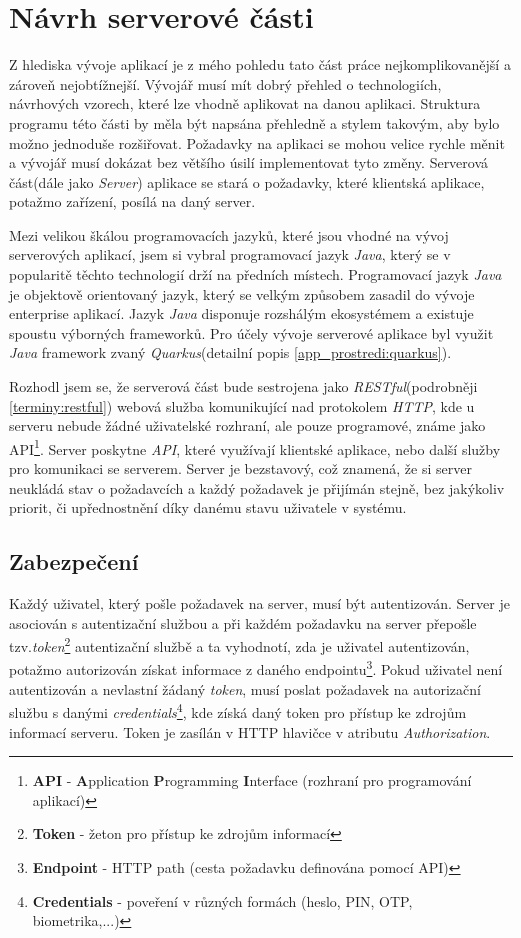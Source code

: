 \newpage
\section{Návrh serverové části}
\label{navrh:backend}
Z hlediska vývoje aplikací je z mého pohledu tato část práce nejkomplikovanější a zároveň nejobtížnejší.
Vývojář musí mít dobrý přehled o technologiích, návrhových vzorech, které lze vhodně aplikovat na danou aplikaci.
Struktura programu této části by měla být napsána přehledně a stylem takovým, aby bylo možno jednoduše rozšiřovat.
Požadavky na aplikaci se mohou velice rychle měnit a vývojář musí dokázat bez většího úsilí implementovat tyto změny.
Serverová část(dále jako \emph{Server}) aplikace se stará o požadavky, které klientská aplikace, potažmo zařízení, posílá na daný server.

Mezi velikou škálou programovacích jazyků, které jsou vhodné na vývoj serverových aplikací, jsem si vybral programovací jazyk \emph{Java},
který se v popularitě těchto technologií drží na předních místech. Programovací jazyk \emph{Java} je objektově orientovaný jazyk, který se velkým způsobem zasadil do vývoje enterprise aplikací.
Jazyk \emph{Java} disponuje rozshálým ekosystémem a existuje spoustu výborných frameworků. Pro účely vývoje serverové aplikace byl využit \emph{Java} framework zvaný \emph{Quarkus}(detailní popis \ref{app_prostredi:quarkus}).

Rozhodl jsem se, že serverová část bude sestrojena jako \emph{RESTful}(podrobněji \ref{terminy:restful}) webová služba komunikující nad protokolem \emph{HTTP},
kde u serveru nebude žádné uživatelské rozhraní, ale pouze programové, známe jako API\footnote{\textbf{API} - \textbf{A}pplication \textbf{P}rogramming \textbf{I}nterface (rozhraní pro programování aplikací)}.
Server poskytne \emph{API}, které využívají klientské aplikace, nebo další služby pro komunikaci se serverem.
Server je bezstavový, což znamená, že si server neukládá stav o požadavcích a každý požadavek je přijímán stejně, bez jakýkoliv priorit, či upřednostnění díky danému stavu uživatele v systému.

\subsection*{Zabezpečení}
\label{backend:bezpecnost}
Každý uživatel, který pošle požadavek na server, musí být autentizován.
Server je asociován s autentizační službou a při každém požadavku na server přepošle tzv.\emph{token}\footnote{\textbf{Token} - žeton pro přístup ke zdrojům informací} autentizační službě
a ta vyhodnotí, zda je uživatel autentizován, potažmo autorizován získat informace z daného endpointu\footnote{\textbf{Endpoint} - HTTP path (cesta požadavku definována pomocí API)}.
Pokud uživatel není autentizován a nevlastní žádaný \emph{token}, musí poslat požadavek na autorizační službu s danými \emph{credentials}\footnote{\textbf{Credentials} - poveření v různých formách (heslo, PIN, OTP, biometrika,...)},
kde získá daný token pro přístup ke zdrojům informací serveru. Token je zasílán v HTTP hlavičce v atributu \emph{Authorization}.

